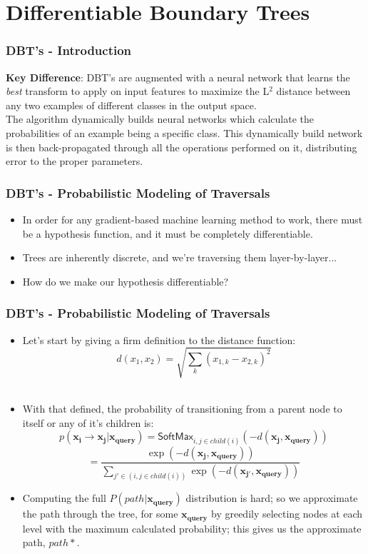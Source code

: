 \documentclass[pdf]{beamer}
\begin{document}
	\section*{Differentiable Boundary Trees}
	\begin{frame}
		\frametitle{DBT's - Introduction}
		
		\textbf{Key Difference}: DBT's are augmented with a neural network that learns the \textit{best} transform to apply on input features to maximize the L$^2$ distance between any two examples of different classes in the output space.\\
		
		The algorithm dynamically builds neural networks which calculate the probabilities of an example being a specific class. This dynamically build network is then back-propagated through all the operations performed on it, distributing error to the proper parameters. 

	\end{frame}
	\begin{frame}
	\frametitle{DBT's - Probabilistic Modeling of Traversals}
		\begin{itemize}
			\item {In order for any gradient-based machine learning method to work, there must be a hypothesis function, and it must be completely differentiable.}
			\item {Trees are inherently discrete, and we're traversing them layer-by-layer...}
			\item {How do we make our hypothesis differentiable?}
		\end{itemize}
	\end{frame}
	\begin{frame}
		\frametitle{DBT's - Probabilistic Modeling of Traversals}
		\begin{itemize}
			\item Let's start by giving a firm definition to the distance function:
				$$d(x_1, x_2) = \sqrt{\sum_{k}\left(x_{1, k} - x_{2, k}\right)^2}$$\\
			\item With that defined, the probability of transitioning from a parent node to itself or any of it's children is: 
			$$ p(\mathbf{x_i} \rightarrow \mathbf{x_j} | \mathbf{x_{query}}) = \mathsf{SoftMax}_{i, j \in child(i)}\left(-d(\mathbf{x_j}, \mathbf{x_{query}})\right)$$
			$$ = \dfrac{\exp(-d(\mathbf{x_j}, \mathbf{x_{query}}))}{
			\sum_{j' \in (i, j \in child(i))} \exp(-d(\mathbf{x_{j'}}, \mathbf{x_{query}}))}$$
			\item Computing the full $P(path | \mathbf{x_{query}})$ distribution is hard; so we approximate the path through the tree, for some $\mathbf{x_{query}}$ by greedily selecting nodes at each level with the maximum calculated probability; this gives us the approximate path, $path*$.
		\end{itemize}
	\end{frame}
\end{document}
